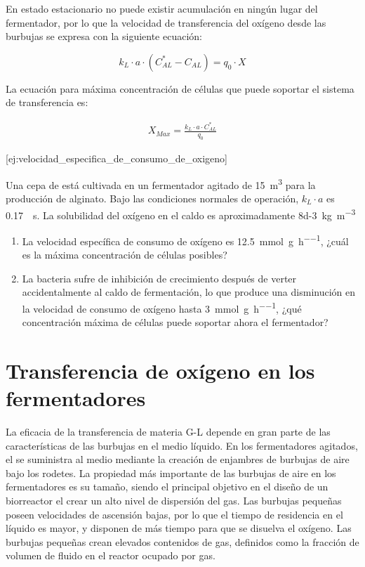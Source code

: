 \documentclass{AsignaturaResumen}
\begin{document}
En estado estacionario no puede existir acumulación en ningún lugar del fermentador, por lo que la velocidad de transferencia del oxígeno desde las burbujas se expresa con la siguiente ecuación:

\begin{equation}
    k_{L} \cdot a \cdot (C_{AL}^{\ast} - C_{AL}) = q_{0} \cdot X
\end{equation}

La ecuación para máxima concentración de células que puede soportar el sistema de transferencia es:

\begin{eqnarray}
    X_{Max} = \frac{k_{L}\cdot a \cdot C_{AL}^{\ast}}{q_{0}}
\end{eqnarray}

[ej:velocidad_especifica_de_consumo_de_oxigeno]{
    Una cepa de  está cultivada en un fermentador agitado de \qty{15}{\m\cubed} para la producción de alginato. Bajo las condiciones normales de operación, $k_{L} \cdot a$ es \qty{0.17}{\per\s}. La solubilidad del oxígeno en el caldo es aproximadamente \qty{8d-3}{\kg\per\m\cubed}
    \begin{enumerate}
        \item La velocidad específica de consumo de oxígeno es \qty{12.5}{\milli\mole\per\g\per\hour}, ¿cuál es la máxima concentración de células posibles?
        \item La bacteria sufre de inhibición de crecimiento después de verter accidentalmente  al caldo de fermentación, lo que produce una disminución en la velocidad de consumo de oxígeno hasta \qty{3}{\milli\mole\per\g\per\hour}, ¿qué concentración máxima de células puede soportar ahora el fermentador?
    \end{enumerate}
}

\section{Transferencia de oxígeno en los fermentadores}

La eficacia de la transferencia de materia G-L depende en gran parte de las características de las burbujas en el medio líquido. En los fermentadores agitados, el  se suministra al medio mediante la creación de enjambres de burbujas de aire bajo los rodetes. La propiedad más importante de las burbujas de aire en los fermentadores es su tamaño, siendo el principal objetivo en el diseño de un biorreactor el crear un alto nivel de dispersión del gas. Las burbujas pequeñas poseen velocidades de ascensión bajas, por lo que el tiempo de residencia en el líquido es mayor, y disponen de más tiempo para que se disuelva el oxígeno. Las burbujas pequeñas crean elevados contenidos de gas, definidos como la fracción de volumen de fluido en el reactor ocupado por gas.
\end{document}

